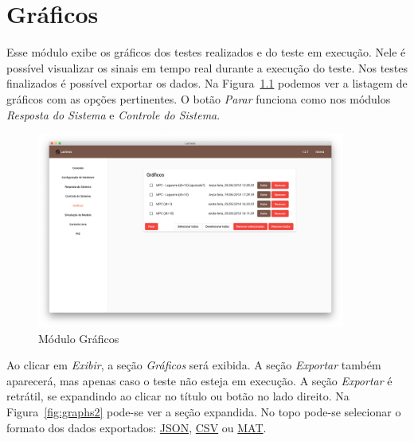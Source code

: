 
\chapter{Gráficos}%
\label{chapter:graficos}

Esse módulo exibe os gráficos dos testes realizados e do teste em execução. Nele
é possível visualizar os sinais em tempo real durante a execução do teste. Nos
testes finalizados é possível exportar os dados. Na Figura~\ref{fig:graphs1}
podemos ver a listagem de gráficos com as opções pertinentes. O botão
\textit{Parar} funciona como nos módulos \textit{Resposta do Sistema} e
\textit{Controle do Sistema}.

\begin{figure}[ht!]
    \centering
    \includegraphics[width=0.9\textwidth]{imgs/graphs1}
    \caption[Módulo Gráficos]{Módulo Gráficos}%
    \label{fig:graphs1}
\end{figure}

Ao clicar em \textit{Exibir}, a seção \textit{Gráficos} será exibida. A seção
\textit{Exportar} também aparecerá, mas apenas caso o teste não esteja em
execução. A seção \textit{Exportar} é retrátil, se expandindo ao clicar no
título ou botão no lado direito. Na Figura~\ref{fig:graphs2} pode-se ver a seção
expandida. No topo pode-se selecionar o formato dos dados exportados:
\href{https://www.json.org/}{JSON},
\href{https://pt.wikipedia.org/wiki/Comma-separated_values}{CSV} ou
\href{https://www.mathworks.com/help/matlab/import_export/supported-file-formats.html}{MAT}.

